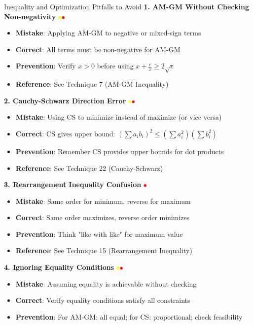 \documentclass{article}
\begin{document}
\begin{trapbox}{Inequality and Optimization Pitfalls to Avoid}
\textbf{1. AM-GM Without Checking Non-negativity} \textcolor{yellow}{$\bullet$}\textcolor{red}{$\bullet$}
\begin{itemize}[nosep]
\item \textbf{Mistake}: Applying AM-GM to negative or mixed-sign terms
\item \textbf{Correct}: All terms must be non-negative for AM-GM
\item \textbf{Prevention}: Verify $x > 0$ before using $x + \frac{c}{x} \geq 2\sqrt{c}$
\item \textbf{Reference}: See Technique 7 (AM-GM Inequality)
\end{itemize}

\textbf{2. Cauchy-Schwarz Direction Error} \textcolor{yellow}{$\bullet$}\textcolor{red}{$\bullet$}
\begin{itemize}[nosep]
\item \textbf{Mistake}: Using CS to minimize instead of maximize (or vice versa)
\item \textbf{Correct}: CS gives upper bound: $(\sum a_i b_i)^2 \leq (\sum a_i^2)(\sum b_i^2)$
\item \textbf{Prevention}: Remember CS provides upper bounds for dot products
\item \textbf{Reference}: See Technique 22 (Cauchy-Schwarz)
\end{itemize}

\textbf{3. Rearrangement Inequality Confusion} \textcolor{red}{$\bullet$}
\begin{itemize}[nosep]
\item \textbf{Mistake}: Same order for minimum, reverse for maximum
\item \textbf{Correct}: Same order maximizes, reverse order minimizes
\item \textbf{Prevention}: Think "like with like" for maximum value
\item \textbf{Reference}: See Technique 15 (Rearrangement Inequality)
\end{itemize}

\textbf{4. Ignoring Equality Conditions} \textcolor{yellow}{$\bullet$}\textcolor{red}{$\bullet$}
\begin{itemize}[nosep]
\item \textbf{Mistake}: Assuming equality is achievable without checking
\item \textbf{Correct}: Verify equality conditions satisfy all constraints
\item \textbf{Prevention}: For AM-GM: all equal; for CS: proportional; check feasibility
\end{itemize}


\end{trapbox}
\end{document}
